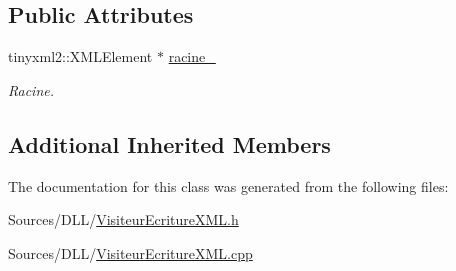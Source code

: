 \subsection*{Public Attributes}
\begin{DoxyCompactItemize}
\item 
tinyxml2\+::\+X\+M\+L\+Element $\ast$ \hyperlink{group__inf2990_ga40b822db4ca8fb0b9d9fa2801562ad03}{racine\+\_\+}
\begin{DoxyCompactList}\small\item\em Racine. \end{DoxyCompactList}\end{DoxyCompactItemize}
\subsection*{Additional Inherited Members}


The documentation for this class was generated from the following files\+:\begin{DoxyCompactItemize}
\item 
Sources/\+D\+L\+L/\hyperlink{_visiteur_ecriture_x_m_l_8h}{Visiteur\+Ecriture\+X\+M\+L.\+h}\item 
Sources/\+D\+L\+L/\hyperlink{_visiteur_ecriture_x_m_l_8cpp}{Visiteur\+Ecriture\+X\+M\+L.\+cpp}\end{DoxyCompactItemize}
